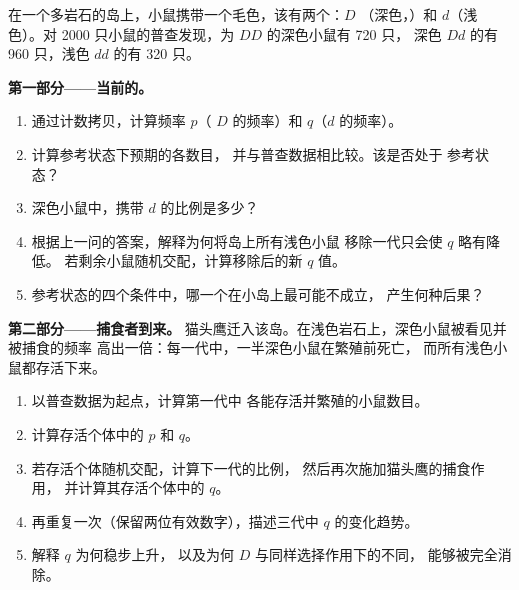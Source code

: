 \begin{problem}
\label{pb:g12:selection-drift-speciation:1}
在一个多岩石的岛上，小鼠携带一个毛色，该有两个：$D$
（深色，）和 $d$（浅色）。对 2000 只小鼠的普查发现，为 $DD$ 的深色小鼠有 720 只，
深色 $Dd$ 的有 960 只，浅色 $dd$ 的有 320 只。

\medskip
\noindent\textbf{第一部分——当前的。}
\begin{enumerate}
  \item 通过计数拷贝，计算频率 $p$（ $D$ 的频率）和
        $q$（$d$ 的频率）。
  \item 计算参考状态下预期的各数目，
        并与普查数据相比较。该是否处于
        参考状态？
  \item 深色小鼠中，携带 $d$ 的比例是多少？
  \item 根据上一问的答案，解释为何将岛上所有浅色小鼠
        移除一代只会使 $q$ 略有降低。
        若剩余小鼠随机交配，计算移除后的新
        $q$ 值。
  \item 参考状态的四个条件中，哪一个在小岛上最可能不成立，
        产生何种后果？
\end{enumerate}

\medskip
\noindent\textbf{第二部分——捕食者到来。}
猫头鹰迁入该岛。在浅色岩石上，深色小鼠被看见并被捕食的频率
高出一倍：每一代中，一半深色小鼠在繁殖前死亡，
而所有浅色小鼠都存活下来。
\begin{enumerate}[resume]
  \item 以普查数据为起点，计算第一代中
        各能存活并繁殖的小鼠数目。
  \item 计算存活个体中的 $p$ 和 $q$。
  \item 若存活个体随机交配，计算下一代的比例，
        然后再次施加猫头鹰的捕食作用，
        并计算其存活个体中的 $q$。
  \item 再重复一次（保留两位有效数字），描述三代中
        $q$ 的变化趋势。
  \item 解释 $q$ 为何稳步上升，
        以及为何 $D$ 与同样选择作用下的不同，
        能够被完全消除。
\end{enumerate}


\end{problem}
